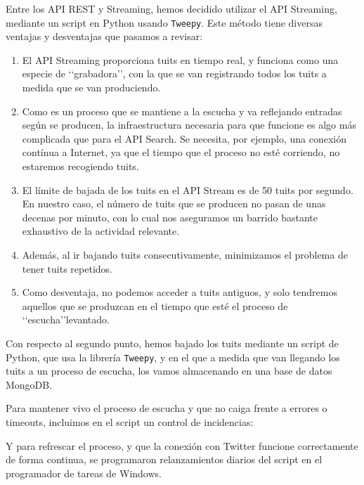 Entre los API REST y Streaming, hemos decidido utilizar el API Streaming, mediante un script
en Python usando {\tt Tweepy}. Este método tiene diversas ventajas y desventajas que pasamos
a revisar:
\begin{enumerate}
\item El API Streaming proporciona tuits en tiempo real, y funciona como una especie de \lq\lq grabadora\rq\rq,
con la que se van registrando todos los tuits a medida que se van produciendo.
\item Como es un proceso que se mantiene a la escucha y va reflejando entradas según
se producen, la infraestructura necesaria para que funcione es algo  más complicada que para
el API Search. Se necesita, por ejemplo, una conexión contínua a Internet, ya que el tiempo que
el proceso no esté corriendo, no estaremos recogiendo tuits.
\item El límite de bajada de los tuits en el API Stream es de 50 tuits por segundo.
En nuestro caso, el número de tuits que se producen no pasan de unas decenas por minuto, con
lo cual nos aseguramos un barrido bastante exhaustivo de la actividad relevante.
\item Además, al ir bajando tuits consecutivamente, minimizamos el problema de tener tuits repetidos.
\item Como desventaja, no podemos acceder a tuits antiguos, y solo tendremos aquellos que 
se produzcan en el tiempo que esté el proceso de \lq\lq escucha\rq\rq levantado.
\end{enumerate}

Con respecto al segundo punto, hemos bajado los tuits mediante un script de Python, 
que usa la librería {\tt Tweepy}, y 
en el que a medida que van llegando los tuits a un proceso de escucha, los vamos 
almacenando en una base de datos MongoDB. 


Para mantener vivo el proceso de escucha y que no caiga frente a errores o timeouts,
incluimos en el script un control de incidencias:


Y para refrescar el proceso, y que la conexión con Twitter funcione correctamente
de forma continua, se programaron relanzamientos diarios del script en el programador 
de tareas de Windows.
 
